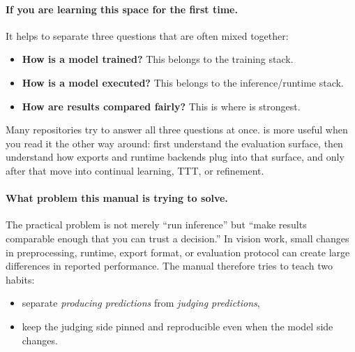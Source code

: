 \paragraph{If you are learning this space for the first time.}
It helps to separate three questions that are often mixed together:
\begin{itemize}
  \item \textbf{How is a model trained?} This belongs to the training stack.
  \item \textbf{How is a model executed?} This belongs to the inference/runtime stack.
  \item \textbf{How are results compared fairly?} This is where \yolozu{} is strongest.
\end{itemize}

Many repositories try to answer all three questions at once. \yolozu{} is more
useful when you read it the other way around: first understand the evaluation
surface, then understand how exports and runtime backends plug into that
surface, and only after that move into continual learning, TTT, or refinement.

\paragraph{What problem this manual is trying to solve.}
The practical problem is not merely ``run inference'' but ``make results
comparable enough that you can trust a decision.'' In vision work, small
changes in preprocessing, runtime, export format, or evaluation protocol can
create large differences in reported performance. The manual therefore tries to
teach two habits:
\begin{itemize}
  \item separate \emph{producing predictions} from \emph{judging predictions},
  \item keep the judging side pinned and reproducible even when the model side changes.
\end{itemize}

